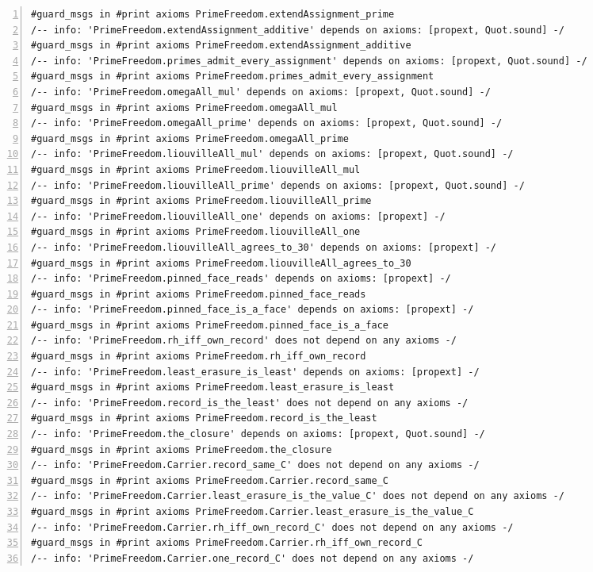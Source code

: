 \documentclass[10pt]{article}
\newcommand{\leansize}{\fontsize{5.5pt}{6.75pt}\selectfont}
\begin{document}
\begin{multicols}{2}
\begin{Verbatim}[numbers=left,firstnumber=1,numbersep=3pt,xleftmargin=2.6em,breaklines=true,breakanywhere=true,breakautoindent=false,breakindent=1.4em,breaksymbolleft={},breakanywheresymbolpre={},fontsize=\leansize]
#guard_msgs in #print axioms PrimeFreedom.extendAssignment_prime
/-- info: 'PrimeFreedom.extendAssignment_additive' depends on axioms: [propext, Quot.sound] -/
#guard_msgs in #print axioms PrimeFreedom.extendAssignment_additive
/-- info: 'PrimeFreedom.primes_admit_every_assignment' depends on axioms: [propext, Quot.sound] -/
#guard_msgs in #print axioms PrimeFreedom.primes_admit_every_assignment
/-- info: 'PrimeFreedom.omegaAll_mul' depends on axioms: [propext, Quot.sound] -/
#guard_msgs in #print axioms PrimeFreedom.omegaAll_mul
/-- info: 'PrimeFreedom.omegaAll_prime' depends on axioms: [propext, Quot.sound] -/
#guard_msgs in #print axioms PrimeFreedom.omegaAll_prime
/-- info: 'PrimeFreedom.liouvilleAll_mul' depends on axioms: [propext, Quot.sound] -/
#guard_msgs in #print axioms PrimeFreedom.liouvilleAll_mul
/-- info: 'PrimeFreedom.liouvilleAll_prime' depends on axioms: [propext, Quot.sound] -/
#guard_msgs in #print axioms PrimeFreedom.liouvilleAll_prime
/-- info: 'PrimeFreedom.liouvilleAll_one' depends on axioms: [propext] -/
#guard_msgs in #print axioms PrimeFreedom.liouvilleAll_one
/-- info: 'PrimeFreedom.liouvilleAll_agrees_to_30' depends on axioms: [propext] -/
#guard_msgs in #print axioms PrimeFreedom.liouvilleAll_agrees_to_30
/-- info: 'PrimeFreedom.pinned_face_reads' depends on axioms: [propext] -/
#guard_msgs in #print axioms PrimeFreedom.pinned_face_reads
/-- info: 'PrimeFreedom.pinned_face_is_a_face' depends on axioms: [propext] -/
#guard_msgs in #print axioms PrimeFreedom.pinned_face_is_a_face
/-- info: 'PrimeFreedom.rh_iff_own_record' does not depend on any axioms -/
#guard_msgs in #print axioms PrimeFreedom.rh_iff_own_record
/-- info: 'PrimeFreedom.least_erasure_is_least' depends on axioms: [propext] -/
#guard_msgs in #print axioms PrimeFreedom.least_erasure_is_least
/-- info: 'PrimeFreedom.record_is_the_least' does not depend on any axioms -/
#guard_msgs in #print axioms PrimeFreedom.record_is_the_least
/-- info: 'PrimeFreedom.the_closure' depends on axioms: [propext, Quot.sound] -/
#guard_msgs in #print axioms PrimeFreedom.the_closure
/-- info: 'PrimeFreedom.Carrier.record_same_C' does not depend on any axioms -/
#guard_msgs in #print axioms PrimeFreedom.Carrier.record_same_C
/-- info: 'PrimeFreedom.Carrier.least_erasure_is_the_value_C' does not depend on any axioms -/
#guard_msgs in #print axioms PrimeFreedom.Carrier.least_erasure_is_the_value_C
/-- info: 'PrimeFreedom.Carrier.rh_iff_own_record_C' does not depend on any axioms -/
#guard_msgs in #print axioms PrimeFreedom.Carrier.rh_iff_own_record_C
/-- info: 'PrimeFreedom.Carrier.one_record_C' does not depend on any axioms -/

\end{Verbatim}
\end{multicols}
\end{document}
